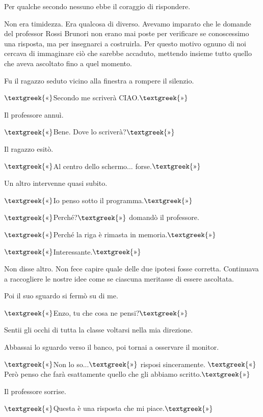 \documentclass{article}
\begin{document}
Per qualche secondo nessuno ebbe il coraggio di rispondere.

Non era timidezza. Era qualcosa di diverso. Avevamo imparato che le domande del professor Rossi Brunori non erano mai
poste per verificare se conoscessimo una risposta, ma per insegnarci a costruirla. Per questo motivo ognuno di noi
cercava di immaginare ciò che sarebbe accaduto, mettendo insieme tutto quello che aveva ascoltato fino a quel momento.

Fu il ragazzo seduto vicino alla finestra a rompere il silenzio.

$\text{\textgreek{«}}$Secondo me scriverà {\textquotedbl}CIAO{\textquotedbl}.$\text{\textgreek{»}}$

Il professore annuì.

$\text{\textgreek{«}}$Bene. Dove lo scriverà?$\text{\textgreek{»}}$

Il ragazzo esitò.

$\text{\textgreek{«}}$Al centro dello schermo... forse.$\text{\textgreek{»}}$

Un altro intervenne quasi subito.

$\text{\textgreek{«}}$Io penso sotto il programma.$\text{\textgreek{»}}$

$\text{\textgreek{«}}$Perché?$\text{\textgreek{»}}$ domandò il professore.

$\text{\textgreek{«}}$Perché la riga è rimasta in memoria.$\text{\textgreek{»}}$

$\text{\textgreek{«}}$Interessante.$\text{\textgreek{»}}$

Non disse altro. Non fece capire quale delle due ipotesi fosse corretta. Continuava a raccogliere le nostre idee come se
ciascuna meritasse di essere ascoltata.

Poi il suo sguardo si fermò su di me.

$\text{\textgreek{«}}$Enzo, tu che cosa ne pensi?$\text{\textgreek{»}}$

Sentii gli occhi di tutta la classe voltarsi nella mia direzione.

Abbassai lo sguardo verso il banco, poi tornai a osservare il monitor.

$\text{\textgreek{«}}$Non lo so...$\text{\textgreek{»}}$ risposi sinceramente. $\text{\textgreek{«}}$Però penso che farà
esattamente quello che gli abbiamo scritto.$\text{\textgreek{»}}$

Il professore sorrise.

$\text{\textgreek{«}}$Questa è una risposta che mi piace.$\text{\textgreek{»}}$
\end{document}
